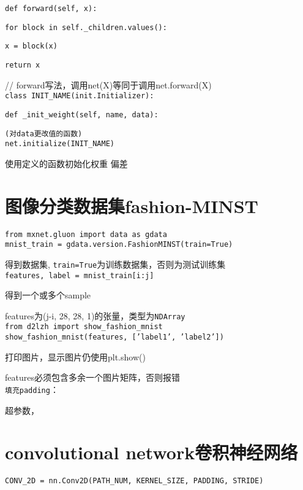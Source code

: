 \documentclass[UTF8]{ctexart}
\begin{document}
  \texttt{def forward(self, x):}

  \quad \texttt{for block in self.\_children.values():}

  \quad \quad \texttt{x = block(x)}

  \quad \quad \texttt{return x}

  // forward写法，调用net(X)等同于调用net.forward(X)\\
\texttt{class INIT\_NAME(init.Initializer):}

  \texttt{def \_init\_weight(self, name, data):}

  \quad \texttt{(对data更改值的函数)}\\
\texttt{net.initialize(INIT\_NAME)}

  使用定义的函数初始化权重 偏差

\section{图像分类数据集fashion-MINST}
\noindent \texttt{from mxnet.gluon import data as gdata}\\
\texttt{mnist\_train = gdata.version.FashionMINST(train=True)} 

  得到数据集, \texttt{train=True}为训练数据集，否则为测试训练集\\
\texttt{features, label = mnist\_train[i:j]}
  
  得到一个或多个sample
  
  features为(j-i, 28, 28, 1)的张量，类型为\texttt{NDArray}\\
\texttt{from d2lzh import show\_fashion\_mnist}\\
\texttt{show\_fashion\_mnist(features, ['label1', 'label2'])}

  打印图片，显示图片仍使用plt.show()

  features必须包含多余一个图片矩阵，否则报错\\
\texttt{填充padding}：
  
  超参数，

\section{convolutional network卷积神经网络}
\noindent \texttt{CONV\_2D = nn.Conv2D(PATH\_NUM, KERNEL\_SIZE, PADDING, STRIDE)}
\end{document}
